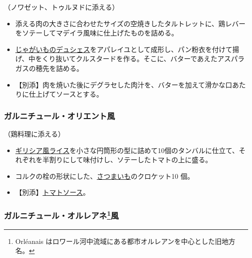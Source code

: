 \begin{recette}


（ノワゼット、トゥルヌドに添える）

\begin{itemize}
\item
  添える肉の大きさに合わせたサイズの空焼きしたタルトレットに、鶏レバーをソテーしてマデイラ風味に仕上げたものを詰める。
\item
  \protect\hyperlink{pommes-de-teres-duchesse}{じゃがいものデュシェス}をアパレイユとして成形し、パン粉衣を付けて揚げ、中をくり抜いてクルスタードを作る。そこに、バターであえたアスパラガスの穂先を詰める。
\item
  【別添】肉を焼いた後にデグラセした肉汁を、バターを加えて滑かな口あたりに仕上げてソースとする。
\end{itemize}

\atoaki{}

\hypertarget{garniture-a-l-orientale}{%
\subsubsection{ガルニチュール・オリエント風}\label{garniture-a-l-orientale}}



（鶏料理に添える）

\begin{itemize}
\item
  \protect\hyperlink{riz-a-la-grecque}{ギリシア風ライス}を小さな円筒形の型に詰めて10個のタンバルに仕立て、それぞれを半割りにして味付けし、ソテーしたトマトの上に盛る。
\item
  コルクの栓の形状にした、\protect\hyperlink{patates-douces}{さつまいも}のクロケット10
  個。
\item
  【別添】\protect\hyperlink{sauce-tomate}{トマトソース}。
\end{itemize}

\atoaki{}

\hypertarget{garniture-a-l-oreanaise}{%
\subsubsection[ガルニチュール・オルレアネ風]{\texorpdfstring{ガルニチュール・オルレアネ\footnote{Orléanais
  はロワール河中流域にある都市オルレアンを中心とした旧地方名。}風}{ガルニチュール・オルレアネ風}}\label{garniture-a-l-oreanaise}}


\end{recette}
